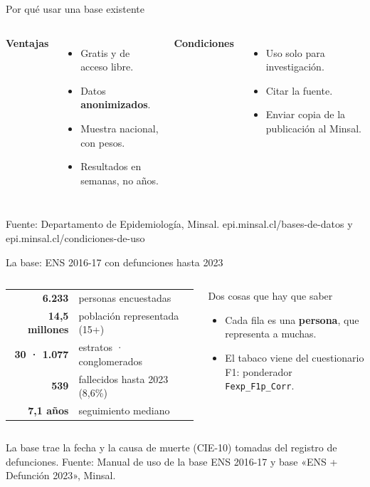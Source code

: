 \documentclass[aspectratio=169,11pt]{beamer}
\newcommand{\dato}[1]{\textcolor{azul}{\textbf{#1}}}
\newcommand{\fuente}[1]{\vfill{\tiny\color{gris} #1}}
\begin{document}
\begin{frame}{Por qué usar una base existente}
\begin{columns}[T]
\textbf{Ventajas}
\begin{itemize}
  \item Gratis y de acceso libre.
  \item Datos \textbf{anonimizados}.
  \item Muestra nacional, con pesos.
  \item Resultados en semanas, no años.
\end{itemize}
\textbf{Condiciones}
\begin{itemize}
  \item Uso \alert{solo para investigación}.
  \item \alert{Citar la fuente}.
  \item \alert{Enviar copia} de la publicación al Minsal.
\end{itemize}
\end{columns}
\fuente{Fuente: Departamento de Epidemiología, Minsal. epi.minsal.cl/bases-de-datos y epi.minsal.cl/condiciones-de-uso}
\end{frame}

\begin{frame}{La base: ENS 2016-17 con defunciones hasta 2023}
\begin{columns}[T]
\begin{tabular}{@{}rl@{}}
\dato{6.233} & personas encuestadas\\
\dato{14,5 millones} & población representada (15+)\\
\dato{30 · 1.077} & estratos · conglomerados\\
\dato{539} & fallecidos hasta 2023 (8,6\%)\\
\dato{7,1 años} & seguimiento mediano
\end{tabular}
\begin{alertblock}{Dos cosas que hay que saber}
\begin{itemize}
  \item Cada fila es una \textbf{persona}, que representa a muchas.
  \item El tabaco viene del cuestionario F1: ponderador \texttt{Fexp\_F1p\_Corr}.
\end{itemize}
\end{alertblock}
\end{columns}
\vspace{.5em}
La base trae la fecha y la causa de muerte (CIE-10) tomadas del registro de defunciones.
\fuente{Fuente: Manual de uso de la base ENS 2016-17 y base «ENS + Defunción 2023», Minsal.}
\end{frame}
\end{document}
